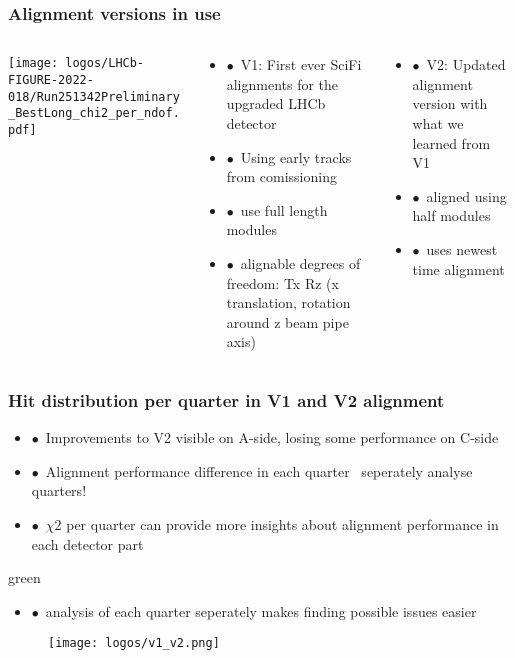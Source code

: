 \documentclass[aspectratio=1610, 12pt, xcolor=dvipsnames]{beamer}
\begin{document}
\begin{frame}\frametitle{Alignment versions in use}
  \begin{columns}
    \begin{column}[c]{0.33\textwidth}
      \centering
      \texttt{[image: logos/LHCb-FIGURE-2022-018/Run251342Preliminary\_BestLong\_chi2\_per\_ndof.pdf]}
    \end{column}
    \begin{column}[c]{0.33\textwidth}
      \begin{itemize}
        \item $\bullet$\, V1: First ever SciFi alignments for the upgraded LHCb detector
	\item $\bullet$\, Using early tracks from comissioning
        \item $\bullet$\, use full length modules
        \item $\bullet$\, alignable degrees of freedom: Tx Rz (x translation, rotation around z \to beam pipe axis)
      \end{itemize}
    \end{column}
    \begin{column}[c]{0.33\textwidth}
      \begin{itemize}
        \item $\bullet$\, V2: Updated alignment version with what we learned from V1 %
        \item $\bullet$\, aligned using half modules
        \item $\bullet$\, uses newest time alignment
      \end{itemize}
    \end{column}
  \end{columns}
\end{frame}

\begin{frame}\frametitle{Hit distribution per quarter in V1 and V2 alignment}
  \begin{itemize}
    \item $\bullet$\, Improvements to V2 visible on A-side, losing some performance on C-side
    \item $\bullet$\, Alignment performance difference in each quarter \to\, seperately analyse quarters!
    \item $\bullet$\, $\chi2$ per quarter can provide more insights about alignment performance in each detector part
  \end{itemize}
  \begin{mybox}{green}{}
    \begin{itemize}
      \item $\bullet$\, analysis of each quarter seperately makes finding possible issues easier
    \end{itemize}
  \end{mybox}
  \begin{figure}
      \texttt{[image: logos/v1\_v2.png]}%
  \end{figure}
\end{frame}
\end{document}
